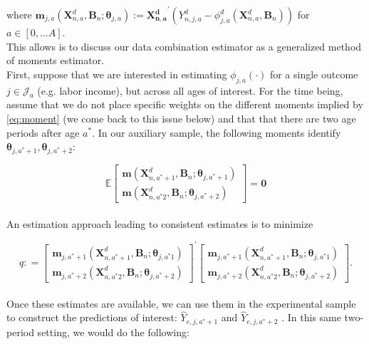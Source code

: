 \noindent where $\bm{m}_{j,a} \left( \bm{X}_{n,a}^d, \bm{B}_{n} ; \bm{\theta}_{j,a} \right) := {\bm{X_{n,a}^d}}^{'} \left( Y_{n,j,a}^d -   \phi^d_{j,a} \left( \bm{X}_{n,a}^d, \bm{B}_{n} \right) \right)$ for $a \in [0, \ldots A]$.\\

\noindent This allows is to discuss our data combination estimator as a generalized method of moments estimator.\\

\noindent First, suppose that we are interested in estimating $\phi_{j,a} \left( \cdot \right)$ for a single outcome $j \in \mathcal{J}_{a}$ (e.g. labor income), but across all ages of interest. For the time being, assume that we do not place specific weights on the different moments implied by \eqref{eq:moment} (we come back to this issue below) and that that there are two age periods after age $a^*$. In our auxiliary sample, the following moments identify $\bm{\theta}_{j,a^*+1}, \bm{\theta}_{j,a^*+2}$: 

\begin{equation}
\mathbb{E}
\begin{bmatrix}
\bm{m} \left( \bm{X}_{n,a^*+1}^d, \bm{B}_{n}; \bm{\theta}_{j,a^*+1} \right) \\ \bm{m} \left( \bm{X}_{n,a^*2}^d, \bm{B}_{n}; \bm{\theta}_{j,a^*+2} \right) 
\end{bmatrix}
= \bm{0}
\end{equation}\\

\noindent An estimation approach leading to consistent estimates is to minimize

\begin{equation}
q : = 
{\begin{bmatrix}
\bm{m}_{j,a^*+1} \left( \bm{X}_{n,a^*+1}^d, \bm{B}_{n}; \bm{\theta}_{j,a^*1} \right) \\ \bm{m}_{j,a^*+2} \left( \bm{X}_{n,a^*2}^d, \bm{B}_{n}; \bm{\theta}_{j,a^*+2} \right) 
\end{bmatrix}}^{'}
\begin{bmatrix}
\bm{m}_{j,a^*+1} \left( \bm{X}_{n,a^*+1}^d, \bm{B}_{n}; \bm{\theta}_{j,a^*1} \right) \\ \bm{m}_{j,a^*+2} \left( \bm{X}_{n,a^*2}^d, \bm{B}_{n}; \bm{\theta}_{j,a^*+2} \right) 
\end{bmatrix}. 
\end{equation}\\

\noindent Once these estimates are available, we can use them in the experimental sample to construct the predictions of interest: $\hat{Y}_{e,j,a^*+1}$ and $\hat{Y}_{e,j,a^*+2}$ . In this same two-period setting, we would do the following: 

